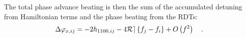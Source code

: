 \label{sec:phasebeating_K1_first}

The total phase advance beating is then the sum of the accumulated detuning from Hamiltonian
terms and the phase beating from the RDTs:
\begin{equation}
  \Delta \varphi_{x,ij} = -2h_{1100,ij} - 4\mathcal{Re} \left\{ f_{j} - f_{i} \right\} + O \left( f^2 \right)
  \quad .
  \label{eq_tune_shift_quad}
\end{equation}

